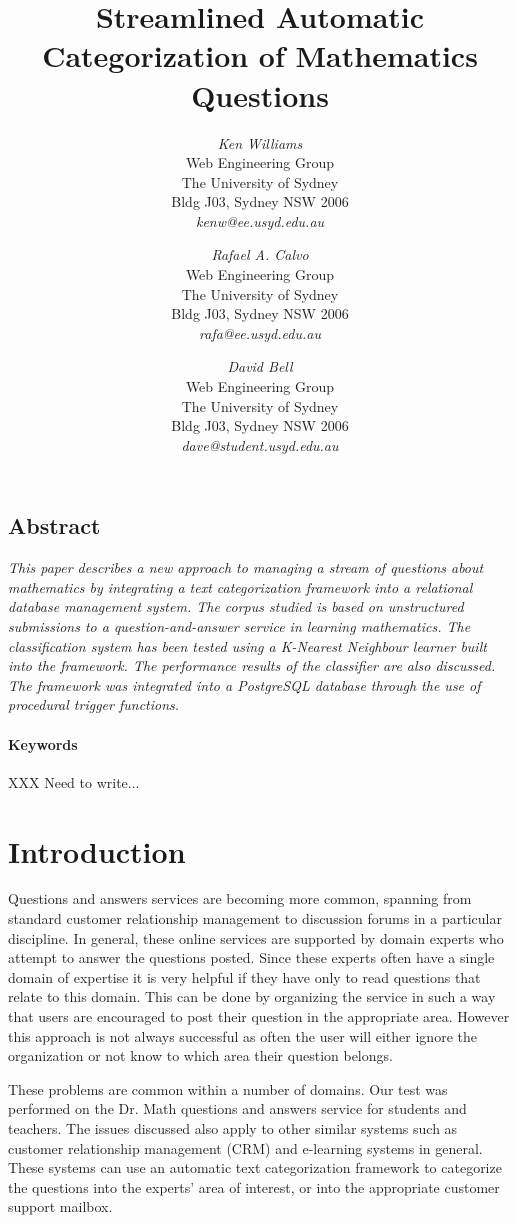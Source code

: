 \documentclass[twocolumn]{article}
\title{Streamlined Automatic Categorization of Mathematics Questions}
\author{
{\em Ken Williams}\\[1ex]
Web Engineering Group\\
The University of Sydney\\
Bldg J03, Sydney NSW 2006\\[1ex]
{\em kenw@ee.usyd.edu.au}
\and
{\em Rafael A. Calvo}\\[1ex]
Web Engineering Group\\
The University of Sydney\\
Bldg J03, Sydney NSW 2006\\[1ex]
{\em rafa@ee.usyd.edu.au}
\and
{\em David Bell}\\[1ex]
Web Engineering Group\\
The University of Sydney\\
Bldg J03, Sydney NSW 2006\\[1ex]
{\em dave@student.usyd.edu.au}
}
\begin{document}
\maketitle
\thispagestyle{empty}


\subsection*{\centering Abstract}
\noindent
{\it 
This paper describes a new approach to managing a stream of questions about 
mathematics by integrating a text categorization framework into a relational database 
management system. The corpus studied is based on unstructured submissions to a 
question-and-answer service in learning mathematics. The classification system has 
been tested using a K-Nearest Neighbour learner built into the framework. The 
performance results of the classifier are also discussed. The framework was integrated 
into a PostgreSQL database through the use of procedural trigger functions.
}

\paragraph{Keywords} 
XXX Need to write...



\section{Introduction}

Questions and answers services are becoming more common, spanning from standard 
customer relationship management to discussion forums in a particular discipline. In 
general, these online services are supported by domain experts who attempt to answer 
the questions posted. Since these experts often have a single domain of expertise it is 
very helpful if they have only to read questions that relate to this domain. This can be 
done by organizing the service in such a way that users are encouraged to post their 
question in the appropriate area. However this approach is not always successful as 
often the user will either ignore the organization or not know to which area their 
question belongs. 

These problems are common within a number of domains. Our test was performed on 
the Dr. Math questions and answers service for students and teachers. The issues 
discussed also apply to other similar systems such as customer relationship 
management (CRM) and e-learning systems in general. These systems can use an 
automatic text categorization framework to categorize the questions into the experts' 
area of interest, or into the appropriate customer support mailbox. 
\end{document}
